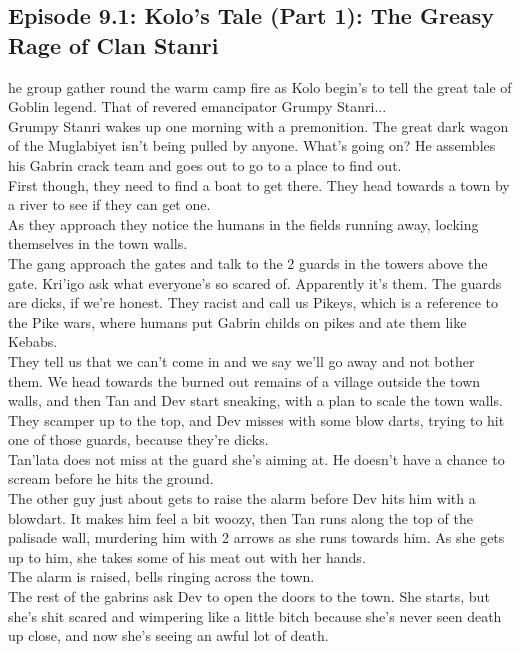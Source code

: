\subsection{Episode 9.1: Kolo's Tale (Part 1): The Greasy Rage of Clan Stanri }
he group gather round the warm camp fire as Kolo begin's to tell the great tale of Goblin legend. That of revered emancipator Grumpy Stanri...\\
Grumpy Stanri wakes up one morning with a premonition. The great dark wagon of the Muglabiyet isn’t being pulled by anyone. What’s going on? He assembles his Gabrin crack team and goes out to go to a place to find out.\\
First though, they need to find a boat to get there. They head towards a town by a river to see if they can get one.\\
As they approach they notice the humans in the fields running away, locking themselves in the town walls.\\
The gang approach the gates and talk to the 2 guards in the towers above the gate. Kri'igo ask what everyone’s so scared of. Apparently it’s them. The guards are dicks, if we’re honest. They racist and call us Pikeys, which is a reference to the Pike wars, where humans put Gabrin childs on pikes and ate them like Kebabs.\\
They tell us that we can’t come in and we say we’ll go away and not bother them. We head towards the burned out remains of a village outside the town walls, and then Tan and Dev start sneaking, with a plan to scale the town walls.\\
They scamper up to the top, and Dev misses with some blow darts, trying to hit one of those guards, because they’re dicks.\\
Tan’lata does not miss at the guard she’s aiming at. He doesn’t have a chance to scream before he hits the ground.\\
The other guy just about gets to raise the alarm before Dev hits him with a blowdart. It makes him feel a bit woozy, then Tan runs along the top of the palisade wall, murdering him with 2 arrows as she runs towards him. As she gets up to him, she takes some of his meat out with her hands.\\
The alarm is raised, bells ringing across the town.\\
The rest of the gabrins ask Dev to open the doors to the town. She starts, but she’s shit scared and wimpering like a little bitch because she’s never seen death up close, and now she’s seeing an awful lot of death.\\
